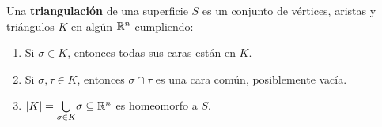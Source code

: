 \documentclass[GTSResumen.tex]{subfiles}
\begin{document}
\begin{defi}
Una \textbf{triangulación} de una superficie $S$ es un conjunto de vértices, aristas y triángulos $K$  en algún $\mathbb{R}^n$ cumpliendo:
\begin{enumerate}
\item Si $\sigma\in K$, entonces todas sus caras están en $K$.
\item Si $\sigma,\tau\in K$, entonces $\sigma\cap\tau$ es una cara común, posiblemente vacía.
\item $|K|=\underset{\sigma\in K}{\bigcup}\sigma\subseteq\mathbb{R}^n$ es homeomorfo a $S$.
\end{enumerate}
\end{defi}
\begin{comment}
\begin{ej}\label{ejem}\
\begin{enumerate}
\item El borde de un tetraedro triangula a $S^2$.

\begin{tikzpicture}[line cap=round,line join=round,>=triangle 45,x=1.0cm,y=1.0cm]
\clip(-1.008,-0.8) rectangle (11.258666666666668,2.2);
\draw (0.,0.)-- (2.,-0.6373333333333323);
\draw (0.,0.)-- (1.584,2.008);
\draw (2.,-0.6373333333333323)-- (3.,0.);
\draw (1.584,2.008)-- (3.,0.);
\draw (2.,-0.6373333333333323)-- (1.584,2.008);
\draw [dash pattern=on 3pt off 3pt] (0.,0.)-- (3.,0.);
\draw (3.12,1.1226666666666671) node[anchor=north west] {\large{$\cong\ S^2$}};
\end{tikzpicture}

\item Triangulación del toro.


\end{comment}
\end{document}
